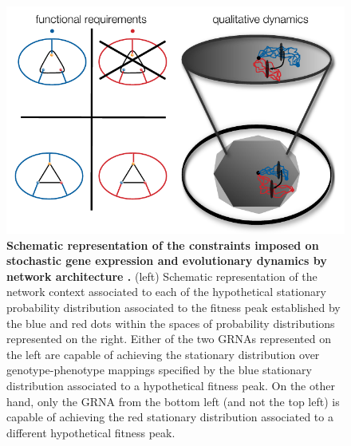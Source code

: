 \begin{figure}[!ht]
\centering
\noindent\includegraphics[width=0.9\columnwidth]{fig/stochdynscheme.pdf}
\caption{{\bf Schematic representation of the constraints imposed on stochastic gene expression and evolutionary dynamics by network architecture .} (left) Schematic representation of the network context associated to each of the hypothetical stationary probability distribution associated to the fitness peak established by the blue and red dots within the spaces of probability distributions represented on the right. Either of the two GRNAs represented on the left are capable of achieving the stationary distribution over genotype-phenotype mappings specified by the blue stationary distribution associated to a hypothetical fitness peak. On the other hand, only the GRNA from the bottom left (and not the top left) is capable of achieving the red stationary distribution associated to a different hypothetical fitness peak.}
\label{fig:stochdynscheme}
\end{figure}
